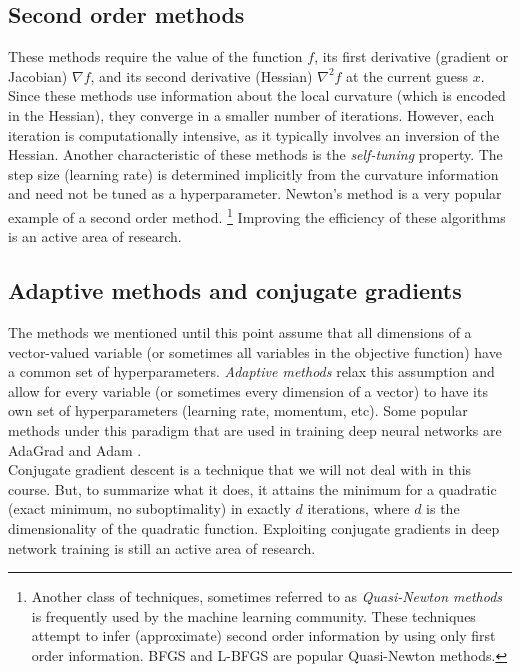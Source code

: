 \documentclass{article}
\begin{document}
\subsection{Second order methods} These methods require the value of the function $f$, its first derivative (gradient or Jacobian) $\nabla f$, and its second derivative (Hessian) $\nabla^2 f$ at the current guess $x$. Since these methods use information about the local curvature (which is encoded in the Hessian), they converge in a smaller number of iterations. However, each iteration is computationally intensive, as it typically involves an inversion of the Hessian. Another characteristic of these methods is the \emph{self-tuning} property. The step size (learning rate) is determined implicitly from the curvature information and need not be tuned as a hyperparameter. Newton's method is a very popular example of a second order method. \footnote{Another class of techniques, sometimes referred to as \emph{Quasi-Newton methods} is frequently used by the machine learning community. These techniques attempt to infer (approximate) second order information by using only first order information. BFGS and L-BFGS are popular Quasi-Newton methods.} Improving the efficiency of these algorithms is an active area of research.

\subsection{Adaptive methods and conjugate gradients} 

The methods we mentioned until this point assume that all dimensions of a vector-valued variable (or sometimes all variables in the objective function) have a common set of hyperparameters. \emph{Adaptive methods} relax this assumption and allow for every variable (or sometimes every dimension of a vector) to have its own set of hyperparameters (learning rate, momentum, etc). Some popular methods under this paradigm that are used in training deep neural networks are AdaGrad \cite{adagrad} and Adam \cite{adam}. \\

Conjugate gradient descent is a technique that we will not deal with in this course. But, to summarize what it does, it attains the minimum for a quadratic (exact minimum, no suboptimality) in exactly $d$ iterations, where $d$ is the dimensionality of the quadratic function. Exploiting conjugate gradients in deep network training is still an active area of research.


\newcommand{\supff}{\sup_{f \in \mathcal{F}}}
\end{document}

